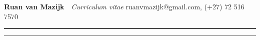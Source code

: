 {\huge \textbf{Ruan van Mazijk}}~~{\Large \textit{Curriculum vitae}}
                                \hfill ruanvmazijk@gmail.com, (+27) 72 516 7570

\vskip10pt \hrule \vskip2pt \hrule
